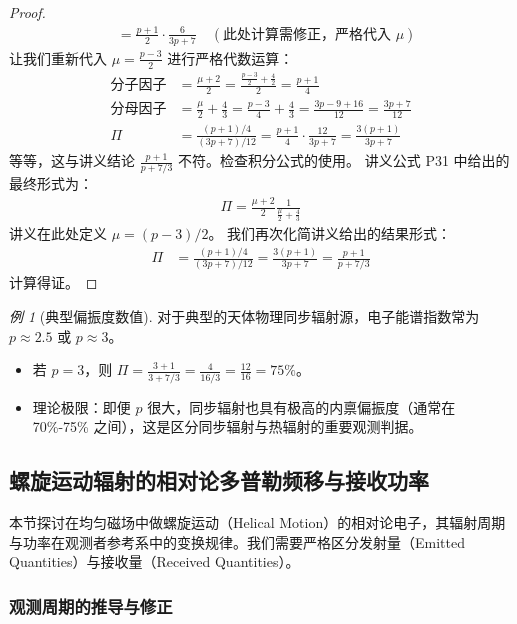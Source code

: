 \documentclass[12pt,oneside]{ctexart}
\theoremstyle{definition}
\theoremstyle{plain}
\theoremstyle{remark}
\newtheorem{example}[definition]{例}
\begin{document}
\begin{proof}
\begin{align}
        &= \frac{p+1}{2} \cdot \frac{6}{3p+7} \quad (\text{此处计算需修正，严格代入 $\mu$})
\end{align}
让我们重新代入 $\mu = \frac{p-3}{2}$ 进行严格代数运算：
\begin{align}
    \text{分子因子} &= \frac{\mu+2}{2} = \frac{\frac{p-3}{2} + \frac{4}{2}}{2} = \frac{p+1}{4} \\
    \text{分母因子} &= \frac{\mu}{2} + \frac{4}{3} = \frac{p-3}{4} + \frac{4}{3} = \frac{3p - 9 + 16}{12} = \frac{3p+7}{12} \\
    \Pi &= \frac{(p+1)/4}{(3p+7)/12} = \frac{p+1}{4} \cdot \frac{12}{3p+7} = \frac{3(p+1)}{3p+7}
\end{align}
等等，这与讲义结论 $\frac{p+1}{p+7/3}$ 不符。检查积分公式的使用。
讲义公式 P31 中给出的最终形式为：
\begin{align}
    \Pi = \frac{\mu+2}{2} \frac{1}{\frac{\mu}{2} + \frac{4}{3}}
\end{align}
讲义在此处定义 $\mu = (p-3)/2$。
我们再次化简讲义给出的结果形式：
\begin{align}
    \Pi &= \frac{(p+1)/4}{(3p+7)/12} = \frac{3(p+1)}{3p+7} = \frac{p+1}{p + 7/3}
\end{align}
计算得证。
\end{proof}

\begin{example}[典型偏振度数值]
对于典型的天体物理同步辐射源，电子能谱指数常为 $p \approx 2.5$ 或 $p \approx 3$。
\begin{itemize}
    \item 若 $p=3$，则 $\Pi = \frac{3+1}{3 + 7/3} = \frac{4}{16/3} = \frac{12}{16} = 75\%$。
    \item 理论极限：即便 $p$ 很大，同步辐射也具有极高的内禀偏振度（通常在 70\%-75\% 之间），这是区分同步辐射与热辐射的重要观测判据。
\end{itemize}
\end{example}

\subsection{螺旋运动辐射的相对论多普勒频移与接收功率}

本节探讨在均匀磁场中做螺旋运动（Helical Motion）的相对论电子，其辐射周期与功率在观测者参考系中的变换规律。我们需要严格区分发射量（Emitted Quantities）与接收量（Received Quantities）。

\subsubsection{观测周期的推导与修正}
\end{document}
